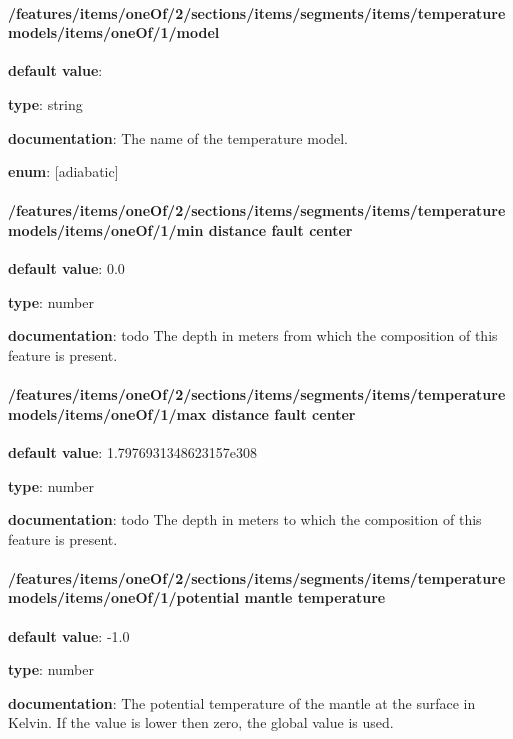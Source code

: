 \paragraph{/features/items/oneOf/2/sections/items/segments/items/temperature models/items/oneOf/1/model} \begin{itemized}
\item {\bf default value}: 
\item {\bf type}: string
\item {\bf documentation}: The name of the temperature model.
\item {\bf enum}: [adiabatic]\end{itemized}\paragraph{/features/items/oneOf/2/sections/items/segments/items/temperature models/items/oneOf/1/min distance fault center} \begin{itemized}
\item {\bf default value}: 0.0
\item {\bf type}: number
\item {\bf documentation}: todo The depth in meters from which the composition of this feature is present.
\end{itemized}\paragraph{/features/items/oneOf/2/sections/items/segments/items/temperature models/items/oneOf/1/max distance fault center} \begin{itemized}
\item {\bf default value}: 1.7976931348623157e308
\item {\bf type}: number
\item {\bf documentation}: todo The depth in meters to which the composition of this feature is present.
\end{itemized}\paragraph{/features/items/oneOf/2/sections/items/segments/items/temperature models/items/oneOf/1/potential mantle temperature} \begin{itemized}
\item {\bf default value}: -1.0
\item {\bf type}: number
\item {\bf documentation}: The potential temperature of the mantle at the surface in Kelvin. If the value is lower then zero, the global value is used.

\end{itemized}
